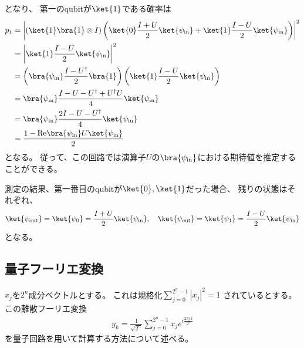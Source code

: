 \documentclass[]{ltjsarticle}
\renewcommand{\Re}{\mathrm{Re}}
\begin{document}
となり、
第一のqubitが$\ket{1}$である確率は
\begin{align}
    p_1
    &=
    \left|
        (\ket{1}\bra{1} \otimes I)
        \left(
            \ket{0}\frac{I + U}{2}\ket{\psi_\text{in}}
            +
            \ket{1}\frac{I - U}{2}\ket{\psi_\text{in}}
        \right)
    \right|^2 \\
    &=
    \left|
        \ket{1}\frac{I - U}{2}\ket{\psi_\text{in}}
    \right|^2 \\
    &=
    \left(
        \bra{\psi_\text{in}}\frac{I - U^\dagger}{2}\bra{1}
    \right)
    \left(
        \ket{1}\frac{I - U}{2}\ket{\psi_\text{in}}
    \right) \\
    &=
    \bra{\psi_\text{in}}
    \frac{I - U - U^\dagger + U^\dagger U}{4}
    \ket{\psi_\text{in}} \\
    &=
    \bra{\psi_\text{in}}
    \frac{2I - U - U^\dagger}{4}
    \ket{\psi_\text{in}} \\
    &=
    \frac{1 - \Re\bra{\psi_\text{in}}U\ket{\psi_\text{in}}}{2}
\end{align}
となる。
従って、この回路では演算子$U$の$\bra{\psi_\text{in}}$における期待値を推定することができる。

測定の結果、第一番目のqubitが$\ket{0}, \ket{1}$だった場合、
残りの状態はそれぞれ、
\begin{align}
    \ket{\psi_\text{out}}
    =
    \ket{\psi_0}
    =
    \frac{I + U}{2}
    \ket{\psi_\text{in}}, \quad
    \ket{\psi_\text{out}}
    =
    \ket{\psi_1}
    =
    \frac{I - U}{2}
    \ket{\psi_\text{in}}
\end{align}
となる。



\subsection{量子フーリエ変換}
$x_j$を$2^n$成分ベクトルとする。
これは規格化$\sum_{j=0}^{2^n-1} |x_j|^2 = 1$
されているとする。
この離散フーリエ変換
\begin{align}
    y_k 
    = 
    \frac{1}{\sqrt{2^n}}
    \sum_{j=0}^{2^n-1} x_j e^{i\frac{2\pi jk}{2^n}}
\end{align}
を量子回路を用いて計算する方法について述べる。
\end{document}
